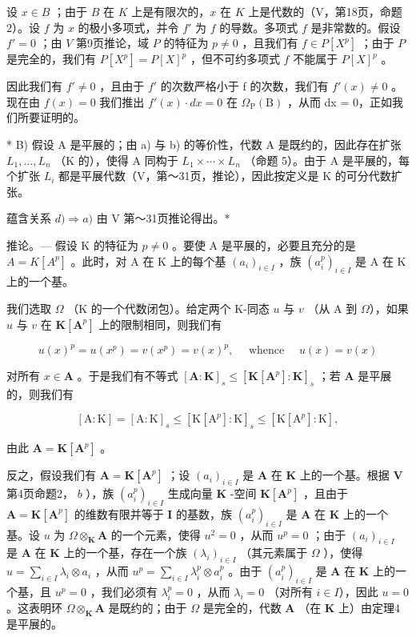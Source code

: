 设 \(x \in B\) ；由于 \(B\) 在 \(K\) 上是有限次的，\(x\) 在 \(K\) 上是代数的（V，第18页，命题2）。设 \(f\) 为 \(x\) 的极小多项式，并令 \(f'\) 为 \(f\) 的导数。多项式 \(f\) 是非常数的。假设 \(f' = 0\) ；由 \(V\) 第9页推论，域 \(P\) 的特征为 \(p \neq 0\) ，且我们有 \(f \in P[X^p]\) ；由于 \(P\) 是完全的，我们有 \(P[X^p] = P[X]^p\) ，但不可约多项式 \(f\) 不能属于 \(P[X]^p\) 。

因此我们有 \(f' \neq 0\) ，且由于 \(f'\) 的次数严格小于 f 的次数，我们有 \(f'(x) \neq 0\) 。现在由 \(f(x) = 0\) 我们推出 \(f'(x) \cdot dx = 0\) 在 \(\Omega_{\mathrm{P}}(\mathrm{B})\) ，从而 dx = 0，正如我们所要证明的。

* B) 假设 A 是平展的；由 a) 与 b) 的等价性，代数 A 是既约的，因此存在扩张 \(L_{1}, \ldots, L_{n}\) （K 的），使得 A 同构于 \(L_{1} \times \cdots \times L_{n}\) （命题 5）。由于 A 是平展的，每个扩张 \(L_{i}\) 都是平展代数（V，第～31页，推论），因此按定义是 K 的可分代数扩张。

蕴含关系 \(d) \Rightarrow a)\) 由 V 第～31页推论得出。*

推论。--- 假设 K 的特征为 \(p \neq 0\) 。要使 A 是平展的，必要且充分的是 \(A = K[A^{p}]\) 。此时，对 A 在 K 上的每个基 \((a_{i})_{i \in I}\) ，族 \((a_{i}^{p})_{i \in I}\) 是 A 在 K 上的一个基。

我们选取 \(\Omega\) （K 的一个代数闭包）。给定两个 K-同态 \(u\) 与 \(v\) （从 A 到 \(\Omega\)），如果 \(u\) 与 \(v\) 在 \(\mathbf{K}[\mathbf{A}^p]\) 上的限制相同，则我们有

\[
u (x) ^ {p} = u \left(x ^ {p}\right) = v \left(x ^ {p}\right) = v (x) ^ {p}, \quad \text { whence } \quad u (x) = v (x)
\]

对所有 \(x \in \mathbf{A}\) 。于是我们有不等式 \([\mathbf{A} : \mathbf{K}]_s \leqslant [\mathbf{K}[\mathbf{A}^p] : \mathbf{K}]_s\) ；若 \(\mathbf{A}\) 是平展的，则我们有

\[
[ \mathrm{A}: \mathrm{K} ] = [ \mathrm{A}: \mathrm{K} ] _ {s} \leqslant [ \mathrm{K} [ \mathrm{A} ^ {p} ]: \mathrm{K} ] _ {s} \leqslant [ \mathrm{K} [ \mathrm{A} ^ {p} ]: \mathrm{K} ],
\]

由此 \(\mathbf{A} = \mathbf{K}[\mathbf{A}^p]\) 。

反之，假设我们有 \(\mathbf{A} = \mathbf{K}[\mathbf{A}^p]\) ；设 \((a_i)_{i\in I}\) 是 \(\mathbf{A}\) 在 \(\mathbf{K}\) 上的一个基。根据 \(\mathbf{V}\) 第4页命题2， \(b\) ），族 \((a_i^p)_{i\in I}\) 生成向量 \(\mathbf{K}\) -空间 \(\mathbf{K}[\mathbf{A}^p]\) ，且由于 \(\mathbf{A} = \mathbf{K}[\mathbf{A}^p]\) 的维数有限并等于 \(\mathbf{I}\) 的基数，族 \((a_i^p)_{i\in I}\) 是 \(\mathbf{A}\) 在 \(\mathbf{K}\) 上的一个基。设 \(u\) 为 \(\Omega \otimes_{\mathbf{K}} \mathbf{A}\) 的一个元素，使得 \(u^2 = 0\) ，从而 \(u^p = 0\) ；由于 \((a_i)_{i\in I}\) 是 \(\mathbf{A}\) 在 \(\mathbf{K}\) 上的一个基，存在一个族 \((\lambda_i)_{i\in I}\) （其元素属于 \(\Omega\) ），使得 \(u = \sum_{i\in I} \lambda_i \otimes a_i\) ，从而 \(u^p = \sum_{i\in I} \lambda_i^p \otimes a_i^p\) 。由于 \((a_i^p)_{i\in I}\) 是 \(\mathbf{A}\) 在 \(\mathbf{K}\) 上的一个基，且 \(u^p = 0\) ，我们必须有 \(\lambda_i^p = 0\) ，从而 \(\lambda_i = 0\) （对所有 \(i\in I\)），因此 \(u = 0\) 。这表明环 \(\Omega \otimes_{\mathbf{K}} \mathbf{A}\) 是既约的；由于 \(\Omega\) 是完全的，代数 \(\mathbf{A}\) （在 \(\mathbf{K}\) 上）由定理4是平展的。

